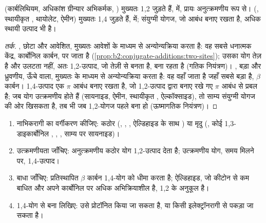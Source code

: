 \begin{proposition}[कौन-सा स्थल]\label{prop:b2:conjugate-additions:regio}
 (कार्बलिथियम, अधिकांश ग्रीन्यार अभिकर्मक, ) मुख्यतः 1,2 जुड़ते हैं,  में, प्रायः अनुत्क्रमणीय रूप से।  (, स्थायीकृत , थायोलेट,
ऐमीन) मुख्यतः 1,4 जुड़ते हैं,  में; संयुग्मी योगज, जो  आबंध बनाए रखता है,
अधिक स्थायी उत्पाद भी है।
\end{proposition}

\begin{proof}[तर्क]
, छोटा और आवेशित, मुख्यतः आवेशों के माध्यम से अन्योन्यक्रिया करता है: वह सबसे धनात्मक
केंद्र, कार्बोनिल कार्बन, पर जाता है (\cref{prop:b2:conjugate-additions:two-sites}); उसका योग तेज़ है और
उलटता नहीं, अतः 1,2-उत्पाद, जो तेज़ी से बनता है, बना रहता है (गतिक नियंत्रण)। ,
बड़ा और ध्रुवणीय, ऊँचे  वाला, मुख्यतः  के माध्यम से अन्योन्यक्रिया करता है: वह वहाँ जाता है जहाँ
 सबसे बड़ा है, $\beta$ कार्बन। 1,4-उत्पाद एक  $\pi$ आबंध बनाए रखता है, जो 1,2-उत्पाद द्वारा बनाए रखे गए
 $\pi$ आबंध से प्रबल है; जब योग उत्क्रमणीय होते हैं (सायनाइड, ऐमीन,
स्थायीकृत , ऐल्कॉक्साइड), तो साम्य संयुग्मी योगज की ओर खिसकता है, तब भी जब
1,2-योगज पहले बना हो (ऊष्मागतिक नियंत्रण)।
\end{proof}

\begin{method}[योग के प्रकार का पूर्वानुमान]\label{met:b2:conjugate-additions:predict-mode}
\begin{enumerate}
  \item नाभिकरागी का वर्गीकरण कीजिए: कठोर (, , , ऐल्डिहाइड के साथ )
        या मृदु (, कोई 1,3-डाइकार्बोनिल , , , साम्य पर सायनाइड)।
  \item उत्क्रमणीयता जाँचिए: अनुत्क्रमणीय कठोर योग 1,2-उत्पाद देता है; उत्क्रमणीय योग,
        समय मिलने पर, 1,4-उत्पाद।
  \item बाधा जाँचिए: प्रतिस्थापित $\beta$ कार्बन 1,4-योग को धीमा करता है; ऐल्डिहाइड, जो कीटोन से कम बाधित
        और अपने कार्बोनिल पर अधिक अभिक्रियाशील है, 1,2 के अनुकूल है।
  \item 1,4-योग से बना  लिखिए: उसे प्रोटॉनित किया जा सकता है, या किसी
        इलेक्ट्रॉनरागी से पकड़ा जा सकता है।
\end{enumerate}
\end{method}

